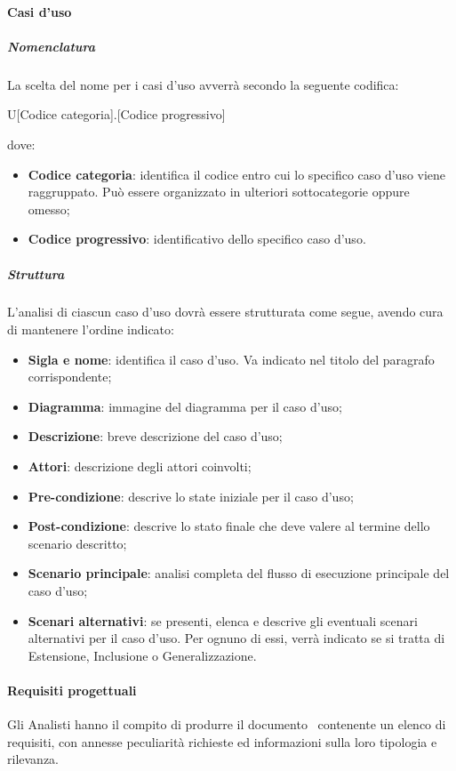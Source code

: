 \paragraph{Casi d'uso}

\subparagraph{Nomenclatura}
La scelta del nome per i casi d'uso avverrà secondo la seguente codifica:
\begin{center}
	U[Codice categoria].[Codice progressivo]
\end{center}
dove:
\begin{itemize}
	\item\textbf{Codice categoria}: identifica il codice entro cui lo specifico caso d'uso viene raggruppato. Può essere organizzato in ulteriori sottocategorie oppure omesso;
	\item\textbf{Codice progressivo}: identificativo dello specifico caso d'uso.
\end{itemize}

\subparagraph{Struttura}
L'analisi di ciascun caso d'uso dovrà essere strutturata come segue, avendo cura di mantenere l'ordine indicato:

\begin{itemize}
	\item\textbf{Sigla e nome}: identifica il caso d'uso. Va indicato nel titolo del paragrafo corrispondente;
	\item\textbf{Diagramma}: immagine del diagramma per il caso d'uso;
	\item\textbf{Descrizione}: breve descrizione del caso d'uso;
	\item\textbf{Attori}: descrizione degli attori coinvolti;
	\item\textbf{Pre-condizione}: descrive lo state iniziale per il caso d'uso;
	\item\textbf{Post-condizione}: descrive lo stato finale che deve valere al termine dello scenario descritto;
	\item\textbf{Scenario principale}: analisi completa del flusso di esecuzione principale del caso d'uso;
	\item\textbf{Scenari alternativi}: se presenti, elenca e descrive gli eventuali scenari alternativi per il caso d'uso. Per ognuno di essi, verrà indicato se si tratta di Estensione, Inclusione o Generalizzazione.
\end{itemize}

\paragraph{Requisiti progettuali}
Gli Analisti hanno il compito di produrre il documento \AdR\ contenente un elenco di requisiti, con annesse peculiarità richieste ed informazioni sulla loro tipologia e rilevanza.


